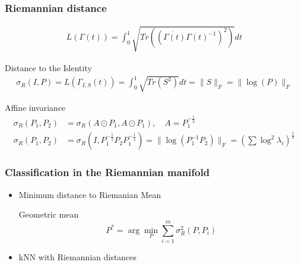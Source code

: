 \documentclass{beamer}
\begin{document}
\begin{frame}
\frametitle{Riemannian distance}

\begin{block}{ }
	\begin{align*}
	L(\Gamma(t)) = \int_{0}^{1}\sqrt{Tr\left( (\dot{\Gamma(t)}\Gamma(t)^{-1})^2 \right) }dt
	\end{align*}
\end{block}

\begin{block}{Distance to the Identity}
	\begin{align*}
	\sigma_R (I, P) =L(\Gamma_{I,S}(t)) = \int_{0}^{1}\sqrt{Tr\left( S^2 \right) }dt = \|S\|_F = \|\log(P)\|_F
	\end{align*}
\end{block}

\begin{block}{Affine invariance}
	\begin{align*}
	\sigma_R (P_1, P_2) & = \sigma_R(A \odot P_1, A \odot P_1), \quad A = P_1^{-\frac12} \\
 \sigma_R (P_1, P_2) & =  \sigma_R (I , P_1^{-\frac12}P_2P_1^{-\frac12})	= \|\log(P_1^{-1}P_2)\|_F = \left( \sum \log^2\lambda_i \right)^{\frac12}
	\end{align*}
\end{block}
\end{frame}




\begin{frame}
\frametitle{ Classification in the Riemannian manifold}
\begin{itemize}
	\item Minimum distance to Riemanian Mean
\begin{block}{Geometric mean}
	\begin{equation*}
	P^* = \arg\min_P \sum_{i=1}^{m}\sigma^2_R(P, P_i)
	\end{equation*}
\end{block}
\vfill
\item kNN with Riemannian distances
\end{itemize}

\end{frame}

\end{document}
